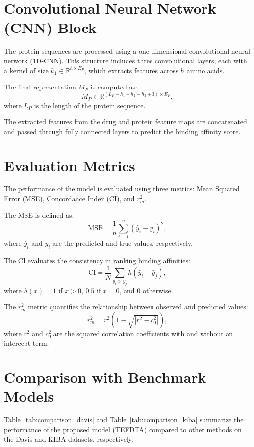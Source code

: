 \documentclass{article}
\begin{document}
\section{Convolutional Neural Network (CNN) Block}
The protein sequences are processed using a one-dimensional convolutional neural network (1D-CNN). This structure includes three convolutional layers, each with a kernel of size $k_1 \in \mathbb{R}^{h \times E_P}$, which extracts features across $h$ amino acids.

The final representation $M_P$ is computed as:
\begin{equation}
	M_P \in \mathbb{R}^{(L_P - h_1 - h_2 - h_3 + 3) \times E_P},
\end{equation}
where $L_P$ is the length of the protein sequence.

The extracted features from the drug and protein feature maps are concatenated and passed through fully connected layers to predict the binding affinity score.

\section{Evaluation Metrics}
The performance of the model is evaluated using three metrics: Mean Squared Error (MSE), Concordance Index (CI), and $r_m^2$. 

The MSE is defined as:
\begin{equation}
	\text{MSE} = \frac{1}{n} \sum_{i=1}^{n} (\hat{y}_i - y_i)^2,
\end{equation}
where $\hat{y}_i$ and $y_i$ are the predicted and true values, respectively.

The CI evaluates the consistency in ranking binding affinities:
\begin{equation}
	\text{CI} = \frac{1}{N} \sum_{y_i > y_j} h(\hat{y}_i - \hat{y}_j),
\end{equation}
where $h(x) = 1$ if $x > 0$, $0.5$ if $x=0$, and $0$ otherwise.

The $r_m^2$ metric quantifies the relationship between observed and predicted values:
\begin{equation}
	r_m^2 = r^2 \left(1 - \sqrt{|r^2 - c_0^2|}\right),
\end{equation}
where $r^2$ and $c_0^2$ are the squared correlation coefficients with and without an intercept term.

\section{Comparison with Benchmark Models}
Table~\ref{tab:comparison_davis} and Table~\ref{tab:comparison_kiba} summarize the performance of the proposed model (TEFDTA) compared to other methods on the Davis and KIBA datasets, respectively.
\end{document}
